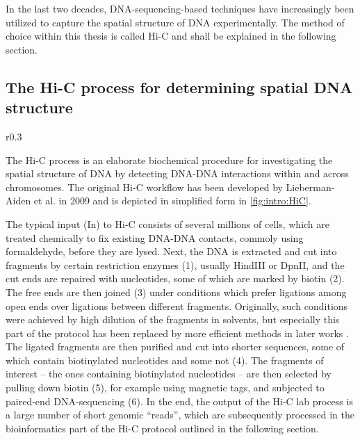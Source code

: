 In the last two decades, DNA-sequencing-based techniques have increasingly been utilized to capture the spatial structure of DNA experimentally.
The method of choice within this thesis is called Hi-C and shall be explained in the following section.

\subsection{The Hi-C process for determining spatial DNA structure} \label{sec:intro:hic}
\begin{wrapfigure}[27]{r}{0.3\textwidth}
 \vspace{-19mm}
 \caption{Hi-C lab process}
 \label{fig:intro:HiC}
\end{wrapfigure}
The Hi-C process is an elaborate biochemical procedure for investigating the 
spatial structure of DNA by detecting DNA-DNA interactions within and 
across chromosomes.
The original Hi-C workflow has been developed by Lieberman-Aiden et al. in 2009  \cite{LiebermanAiden2009}
and is depicted in simplified form in \cref{fig:intro:HiC}.

The typical input (In) to Hi-C consists of several millions of cells,
which are treated chemically to fix existing DNA-DNA contacts, 
commoly using formaldehyde, before they are lysed.
Next, the DNA is extracted and cut into fragments by certain restriction enzymes (1),
usually HindIII or DpnII, 
and the cut ends are repaired with nucleotides, some of which are marked by biotin (2).
The free ends are then joined (3) under conditions which prefer
ligations among open ends over ligations between different fragments.
Originally, such conditions were achieved by high dilution of the fragments in
solvents, but especially this part of the protocol has been replaced by 
more efficient methods in later works \cite{Rao2014,Belaghzal2017}.
The ligated fragments are then purified and cut into shorter sequences,
some of which contain biotinylated nucleotides and some not (4).
The fragments of interest -- the ones containing biotinylated nucleotides -- 
are then selected by pulling down biotin (5), for example using magnetic tags,  
and subjected to paired-end DNA-sequencing (6).
In the end, the output of the Hi-C lab process is a large number of short genomic ``reads'',
which are subsequently processed in the bioinformatics part of the Hi-C protocol 
outlined in the following section.

